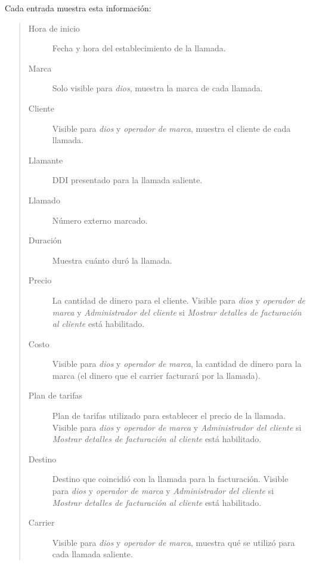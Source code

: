 \documentclass[letterpaper,10pt,spanish]{sphinxmanual}
\begin{document}
Cada entrada muestra esta información:
\begin{quote}
\begin{description}
\item[{Hora de inicio}] \leavevmode
Fecha y hora del establecimiento de la llamada.

\item[{Marca}] \leavevmode
Solo visible para \emph{dios}, muestra la marca de cada llamada.

\item[{Cliente}] \leavevmode
Visible para \emph{dios} y \emph{operador de marca}, muestra el cliente de cada llamada.

\item[{Llamante}] \leavevmode
DDI presentado para la llamada saliente.

\item[{Llamado}] \leavevmode
Número externo marcado.

\item[{Duración}] \leavevmode
Muestra cuánto duró la llamada.

\item[{Precio}] \leavevmode
La cantidad de dinero para el cliente. Visible para \emph{dios} y \emph{operador de marca} y \emph{Administrador del cliente} si \emph{Mostrar detalles de facturación al cliente} está habilitado.

\item[{Costo}] \leavevmode
Visible para \emph{dios} y \emph{operador de marca}, la cantidad de dinero para la marca (el dinero que el carrier facturará por la llamada).

\item[{Plan de tarifas}] \leavevmode
Plan de tarifas utilizado para establecer el precio de la llamada. Visible para \emph{dios} y \emph{operador de marca} y \emph{Administrador del cliente} si \emph{Mostrar detalles de facturación al cliente} está habilitado.

\item[{Destino}] \leavevmode
Destino que coincidió con la llamada para la facturación. Visible para \emph{dios} y \emph{operador de marca} y \emph{Administrador del cliente} si \emph{Mostrar detalles de facturación al cliente} está habilitado.

\item[{Carrier}] \leavevmode
Visible para \emph{dios} y \emph{operador de marca}, muestra qué {\hyperref[administration_portal/brand/providers/carriers:carriers]{}} se utilizó para cada llamada saliente.


\end{description}
\end{quote}
\end{document}
